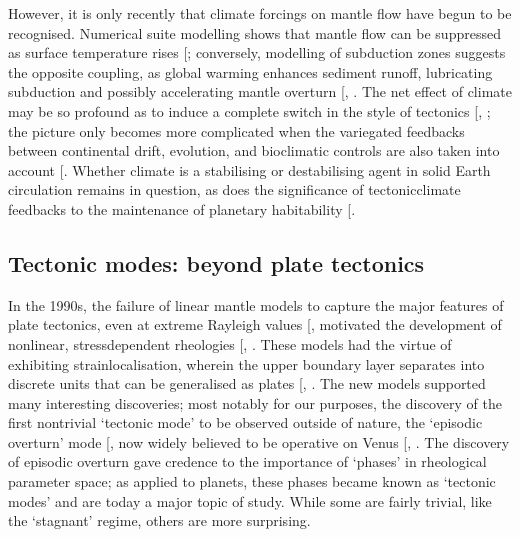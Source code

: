 \documentclass[letterpaper,10pt,english]{jupyterBook}
\begin{document}
\sphinxAtStartPar
However, it is only recently that climate forcings on mantle flow have begun to be recognised. Numerical suite modelling shows that mantle flow can be suppressed as surface temperature rises {[}\sphinxcite{references:id513}{]}; conversely, modelling of subduction zones suggests the opposite coupling, as global warming enhances sediment runoff, lubricating subduction and possibly accelerating mantle overturn {[}, \sphinxcite{references:id298}{]}. The net effect of climate may be so profound as to induce a complete switch in the style of tectonics {[}, \sphinxcite{references:id674}{]}; the picture only becomes more complicated when the variegated feedbacks between continental drift, evolution, and bioclimatic controls are also taken into account {[}\sphinxcite{references:id342}{]}. Whether climate is a stabilising or destabilising agent in solid Earth circulation remains in question, as does the significance of tectonic\sphinxhyphen{}climate feedbacks to the maintenance of planetary habitability {[}\sphinxcite{references:id416}{]}.


\subsection{Tectonic modes: beyond plate tectonics}
\label{\detokenize{content/chapter_01_background/main:tectonic-modes-beyond-plate-tectonics}}
\sphinxAtStartPar
In the 1990s, the failure of linear mantle models to capture the major features of plate tectonics, even at extreme Rayleigh values {[}\sphinxcite{references:id381}{]}, motivated the development of non\sphinxhyphen{}linear, stress\sphinxhyphen{}dependent rheologies {[}, \sphinxcite{references:id408}{]}. These models had the virtue of exhibiting strain\sphinxhyphen{}localisation, wherein the upper boundary layer separates into discrete units that can be generalised as plates {[}, \sphinxcite{references:id385}{]}. The new models supported many interesting discoveries; most notably for our purposes, the discovery of the first non\sphinxhyphen{}trivial ‘tectonic mode’ to be observed outside of nature, the ‘episodic overturn’ mode {[}\sphinxcite{references:id759}{]}, now widely believed to be operative on Venus {[}, \sphinxcite{references:id639}{]}. The discovery of episodic overturn gave credence to the importance of ‘phases’ in rheological parameter space; as applied to planets, these phases became known as ‘tectonic modes’ and are today a major topic of study. While some are fairly trivial, like the ‘stagnant’ regime, others are more surprising.
\end{document}
